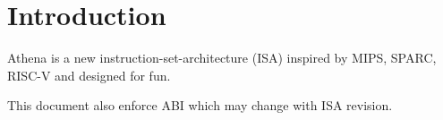 \chapter{Introduction}

Athena is a new instruction-set-architecture (ISA) inspired by MIPS, SPARC, RISC-V and designed for fun.

This document also enforce ABI which may change with ISA revision.